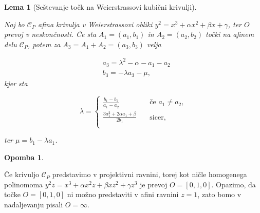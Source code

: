 \documentclass[12pt,a4paper,twoside]{article}
\theoremstyle{definition} %
\newtheorem{opomba}[definicija]{Opomba}
\theoremstyle{plain} %
\newtheorem{lema}[definicija]{Lema}
\numberwithin{equation}{section}  %
\begin{document}
\begin{lema}[Seštevanje točk na Weierstrassovi kubični krivulji]~

\label{sestevanje}
Naj bo $\mathcal{C}_P$ afina krivulja v Weierstrassovi obliki $y^2 = x^3 + \alpha x^2 + \beta x + \gamma$, ter $O$ prevoj v neskončnosti. Če sta $A_1 = (a_1,b_1)$ in $A_2 = (a_2,b_2)$ točki na afinem delu $\mathcal{C}_P$, potem za $A_3 = A_1 + A_2 = (a_3,b_3)$ velja

\begin{align}
&{} a_3 = \lambda ^2 - \alpha - a_1 - a_2 \nonumber \\
&{} b_3 = -\lambda a_3 - \mu, \nonumber
\end{align}
kjer sta 

\[ \lambda =
\begin{cases}
\frac{b_1 - b_2}{a_1 - a_2} & \quad \text{če } a_1 \neq a_2 ,\\
\frac{3a_1^2+ 2 \alpha a_1 + \beta}{2b_1} & \quad \text{sicer} ,\\
\end{cases}
\]

ter $\mu = b_1 - \lambda a_1$.

%

\end{lema}


\begin{opomba}~

Če krivuljo $\mathcal{C}_P$ predstavimo v projektivni ravnini, torej kot ničle homogenega polinomoma $y^2z=x^3+\alpha x^2z+\beta xz^2+ \gamma z^3$ je prevoj $O=[0,1,0].$
Opazimo, da točke $O = [0,1,0]$ ni možno predstaviti v afini ravnini $z=1$, zato bomo v nadaljevanju pisali $O = \infty$.
\end{opomba}
\end{document}
